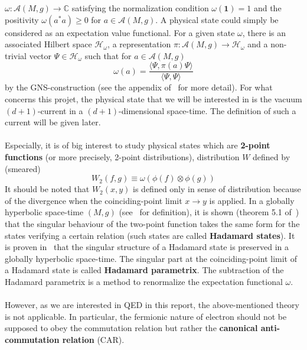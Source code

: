 $\omega: \mathscr{A}(M,g) \rightarrow \mathbb{C}$ satisfying the normalization condition $\omega(\mathbf{1}) = 1$ and the positivity $\omega(a^*a) \geq 0$ for $a\in\mathscr{A}(M,g)$.
A physical state could simply be considered as an expectation value functional. 
For a given state $\omega$, there is an associated Hilbert space $\mathscr{H}_\omega$, a representation $\pi : \mathscr{A}(M,g)\rightarrow \mathscr{H}_\omega$ and a non-trivial vector $\Psi \in \mathscr{H}_\omega$ such that for $a \in \mathscr{A}(M,g)$
\begin{equation*}
\omega(a) = \frac{\langle \Psi, \pi(a)\Psi\rangle}{\langle \Psi, \Psi \rangle}
\end{equation*}
by the GNS-construction (see \eg the appendix of~\cite{Timmermann2008} for more detail).
For what concerns this projet, the physical state that we will be interested in is the vacuum $(d+1)$-current in a $(d+1)$-dimensional space-time.
The definition of such a current will be given later. \\\\
%
Especially, it is of big interest to study physical states which are \textbf{2-point functions} (or more precisely, 2-point distributions), 
\ie distribution $W$ defined by (smeared) 
\begin{equation*}
W_2(f, g ) \equiv \omega(\phi(f)\otimes \phi(g))
\end{equation*}
It should be noted that $W_2(x,y)$ is defined only in sense of distribution because of the divergence when the coinciding-point limit $x\rightarrow y$ is applied.
In a globally hyperbolic space-time $(M,g)$ (see~\cite{Wald2010} for definition), it is shown (theorem 5.1 of~\cite{Radzikowski1996}) that the singular behaviour of the two-point function takes the same form for the states verifying a certain relation (such states are called \textbf{Hadamard states}). 
It is proven in~\cite{Fulling1978} that the singular structure of a Hadamard state is preserved in a globally hyperbolic space-time. 
The singular part at the coinciding-point limit of a Hadamard state is called \textbf{Hadamard parametrix}.
The subtraction of the Hadamard parametrix is a method to renormalize the expectation functional $\omega$. \\\\
%
However, as we are interested in QED in this report, the above-mentioned theory is not applicable. 
In particular, the fermionic nature of electron should not be supposed to obey the commutation relation but rather the \textbf{canonical anti-commutation relation} (CAR).
